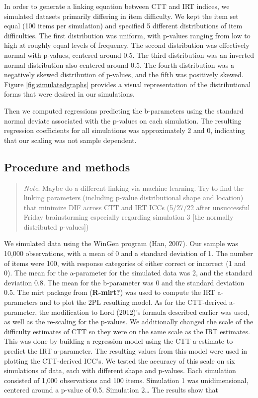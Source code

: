 \documentclass[
  man]{apa6}
\begin{document}
In order to generate a linking equation between CTT and IRT indices, we simulated datasets primarily differing in item difficulty. We kept the item set equal (100 items per simulation) and specified 5 different distributions of item difficulties. The first distribution was uniform, with p-values ranging from low to high at roughly equal levels of frequency. The second distribution was effectively normal with p-values, centered around 0.5. The third distribution was an inverted normal distribution also centered around 0.5. The fourth distribution was a negatively skewed distribution of p-values, and the fifth was positively skewed. Figure \ref{fig:simulatedgraphs} provides a visual representation of the distributional forms that were desired in our simulations.

Then we computed regressions predicting the b-parameters using the standard normal deviate associated with the p-values on each simulation. The resulting regression coefficients for all simulations was approximately 2 and 0, indicating that our scaling was not sample dependent.

\hypertarget{procedure-and-methods}{%
\subsection{Procedure and methods}\label{procedure-and-methods}}

\begin{quote}
\emph{Note}. Maybe do a different linking via machine learning. Try to find the linking parameters (including p-value distributional shape and location) that minimize DIF across CTT and IRT ICCs (5/27/22 after unsuccessful Friday brainstorming especially regarding simulation 3 {[}the normally distributed p-values{]})
\end{quote}

We simulated data using the WinGen program (Han, 2007). Our sample was 10,000 observations, with a mean of 0 and a standard deviation of 1. The number of items were 100, with response categories of either correct or incorrect (1 and 0). The mean for the a-parameter for the simulated data was 2, and the standard deviation 0.8. The mean for the b-parameter was 0 and the standard deviation 0.5. The mirt package from (\textbf{R-mirt?}) was used to compute the IRT a-parameters and to plot the 2PL resulting model. As for the CTT-derived a-parameter, the modification to Lord (2012)'s formula described earlier was used, as well as the re-scaling for the p-values. We additionally changed the scale of the difficulty estimates of CTT so they were on the same scale as the IRT estimates. This was done by building a regression model using the CTT a-estimate to predict the IRT a-parameter. The resulting values from this model were used in plotting the CTT-derived ICC's.
We tested the accuracy of this scale on six simulations of data, each with different shape and p-values. Each simulation consisted of 1,000 observations and 100 items. Simulation 1 was unidimensional, centered around a p-value of 0.5. Simulation 2\ldots{}
The results show that
\end{document}
